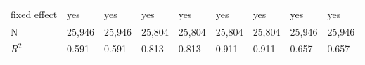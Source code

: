 \begin{tabular}{lllllllll}
\midrule fixed effect        &                                  yes &                                  yes &                                  yes &                                  yes &                                 yes &                                 yes &                                 yes &                                 yes \\
N                            &                               25,946 &                               25,946 &                               25,804 &                               25,804 &                              25,804 &                              25,804 &                              25,946 &                              25,946 \\
$R^2$                        &                                0.591 &                                0.591 &                                0.813 &                                0.813 &                               0.911 &                               0.911 &                               0.657 &                               0.657 \\
\bottomrule
\end{tabular}
